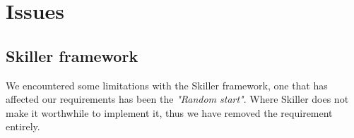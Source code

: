 \section{Issues}


\subsection{Skiller framework}
We encountered some limitations with the Skiller framework, one that has affected our requirements has been the \emph{"Random start"}. Where Skiller does not make it worthwhile to implement it, thus we have removed the requirement entirely.